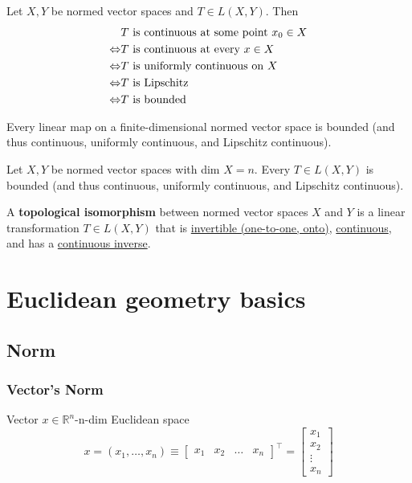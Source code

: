 \documentclass[11pt]{elegantbook}
\begin{document}
\begin{theorem}
    Let $X, Y$ be normed vector spaces and $T \in L(X, Y)$. Then
    \begin{equation}
        \begin{aligned}
            &\textnormal{$T$ is continuous at some point $x_0 \in X$}\\
            \Leftrightarrow&\textnormal{$T$ is continuous at every $x \in X$}\\
            \Leftrightarrow&\textnormal{$T$ is uniformly continuous on $X$}\\
            \Leftrightarrow&\textnormal{$T$ is Lipschitz}\\
            \Leftrightarrow&\textnormal{$T$ is bounded}
        \end{aligned}
        \nonumber
    \end{equation}
\end{theorem}

\begin{note}
    Every linear map on a finite-dimensional normed vector space is bounded (and thus continuous, uniformly continuous, and Lipschitz continuous).
\end{note}
\begin{theorem}
    Let $X, Y$ be normed vector spaces with dim $X = n$. Every $T \in L(X, Y)$ is bounded (and thus continuous, uniformly continuous, and Lipschitz continuous).
\end{theorem}

\begin{definition}
    \normalfont
    A \textbf{topological isomorphism} between normed vector spaces $X$ and $Y$ is a linear transformation $T \in L(X, Y)$ that is \underline{invertible (one-to-one, onto)}, \underline{continuous}, and has a \underline{continuous inverse}.
\end{definition}









\chapter{Euclidean geometry basics}
\section{Norm}
\subsection{Vector's Norm}
Vector $x \in \mathbb{R}^{n}$-n-dim Euclidean space
$$
x=\left(x_{1}, \ldots, x_{n}\right) \equiv\left[\begin{array}{llll}
x_{1} & x_{2} & \ldots & x_{n}
\end{array}\right]^{\top}=\left[\begin{array}{c}
x_{1} \\
x_{2} \\
\vdots \\
x_{n}
\end{array}\right]
$$
\end{document}
